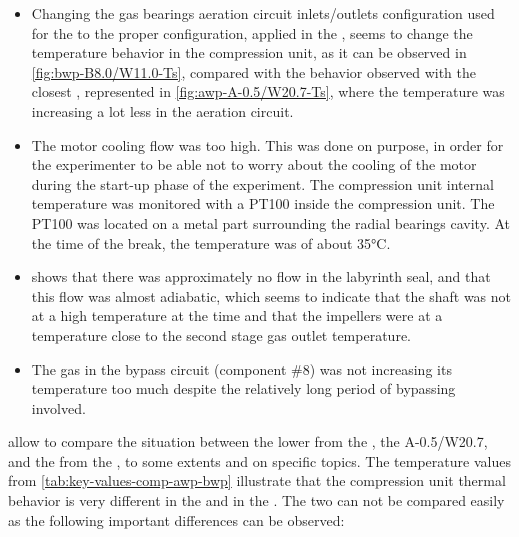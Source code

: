 \begin{itemize}
\item Changing the gas bearings aeration circuit inlets/outlets
  configuration used for the \AWP{} to the proper configuration,
  applied in the \BWP{}, seems to change the temperature behavior in
  the compression unit, as it can be observed in
  \cref{fig:bwp-B8.0/W11.0-Ts}, compared with the behavior observed
  with the closest \AWP{} \OP, represented in
  \cref{fig:awp-A-0.5/W20.7-Ts}, where the temperature was increasing
  a lot less in the aeration circuit.
\item The motor cooling flow was too high. This was done on purpose,
  in order for the experimenter to be able not to worry about the
  cooling of the motor during the start-up phase of the
  experiment. The compression unit internal temperature was monitored
  with a PT100 inside the compression unit. The PT100 was located on a
  metal part surrounding the radial bearings cavity. At the time of
  the break, the temperature was of about
  35\si{\degreeCelsius}.
\item {} shows that there was approximately
  no flow in the labyrinth seal, and that
  this flow was almost adiabatic, which seems to indicate that the
  shaft was not at a high temperature at the time and that the
  impellers were at a temperature close to the second stage gas outlet
  temperature.
\item The gas in the bypass circuit (component \#8) was not increasing
  its temperature too much despite the relatively long period of
  bypassing involved.
\end{itemize}

allow to compare the situation between the lower \OP{} from the \AWP{}
, the \OP{} A-0.5/W20.7, and the \OP{} from the \BWP{}, to some extents
and on specific topics. The temperature values from
\cref{tab:key-values-comp-awp-bwp} illustrate that the compression
unit thermal behavior is very different in the \BWP{} and in the
\AWP{}. The two \OP{} can not be compared easily as the following
important differences can be observed:

